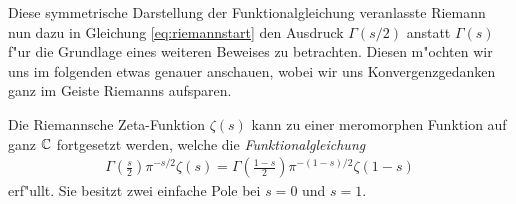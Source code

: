 	Diese symmetrische Darstellung der Funktionalgleichung veranlasste Riemann nun dazu in Gleichung \eqref{eq:riemannstart} den Ausdruck $\Gamma(s/2)$ anstatt $\Gamma(s)$ f"ur die Grundlage eines weiteren Beweises zu betrachten.
	Diesen m"ochten wir uns im folgenden etwas genauer anschauen, wobei wir uns Konvergenzgedanken ganz im Geiste Riemanns aufsparen.
	\begin{satz}
		Die Riemannsche Zeta-Funktion $\zeta(s)$  kann zu einer meromorphen Funktion auf ganz $\mathbb{C}$ fortgesetzt werden, welche die \emph{Funktionalgleichung}
		\begin{align*}
			\Gamma\left(\frac{s}{2}\right)\pi^{-s/2}\zeta(s) = \Gamma\left(\frac{1-s}{2}\right)\pi^{-(1-s)/2}\zeta(1-s)
		\end{align*}
		erf"ullt. Sie besitzt zwei einfache Pole bei $s=0$ und $s=1$.
	\end{satz}
